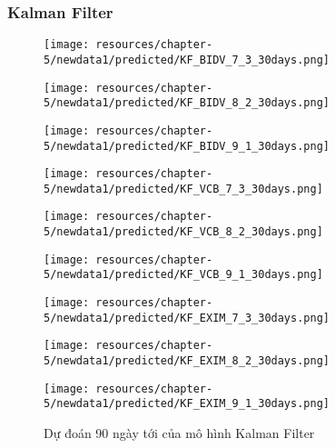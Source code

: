 



\subsubsection{Kalman Filter}
\begin{figure}[H]
    \centering
    \begin{minipage}{0.15\textwidth}
    \centering
    \texttt{[image: resources/chapter-5/newdata1/predicted/KF\_BIDV\_7\_3\_30days.png]}
    \end{minipage}
    \hfill
    \begin{minipage}{0.15\textwidth}
    \centering
    \texttt{[image: resources/chapter-5/newdata1/predicted/KF\_BIDV\_8\_2\_30days.png]}
    \end{minipage}
    \hfill
        \begin{minipage}{0.15\textwidth}
    \centering
    \texttt{[image: resources/chapter-5/newdata1/predicted/KF\_BIDV\_9\_1\_30days.png]}
    \end{minipage}
    \hfill
    \begin{minipage}{0.15\textwidth}
    \centering
    \texttt{[image: resources/chapter-5/newdata1/predicted/KF\_VCB\_7\_3\_30days.png]}
    \end{minipage}
    \hfill
    \begin{minipage}{0.15\textwidth}
    \centering
    \texttt{[image: resources/chapter-5/newdata1/predicted/KF\_VCB\_8\_2\_30days.png]}
    \end{minipage}
    \hfill
        \begin{minipage}{0.15\textwidth}
    \centering
    \texttt{[image: resources/chapter-5/newdata1/predicted/KF\_VCB\_9\_1\_30days.png]}
    \end{minipage}
    \hfill
    \begin{minipage}{0.15\textwidth}
    \centering
    \texttt{[image: resources/chapter-5/newdata1/predicted/KF\_EXIM\_7\_3\_30days.png]}
    \end{minipage}
    \hfill
    \begin{minipage}{0.15\textwidth}
    \centering
    \texttt{[image: resources/chapter-5/newdata1/predicted/KF\_EXIM\_8\_2\_30days.png]}
    \end{minipage}
    \hfill
        \begin{minipage}{0.15\textwidth}
    \centering
    \texttt{[image: resources/chapter-5/newdata1/predicted/KF\_EXIM\_9\_1\_30days.png]}
    \end{minipage}
    \hfill
    
    \caption{Dự đoán 90 ngày tới của mô hình Kalman Filter}
    \label{fig:kalman_filter_30days}
\end{figure}



